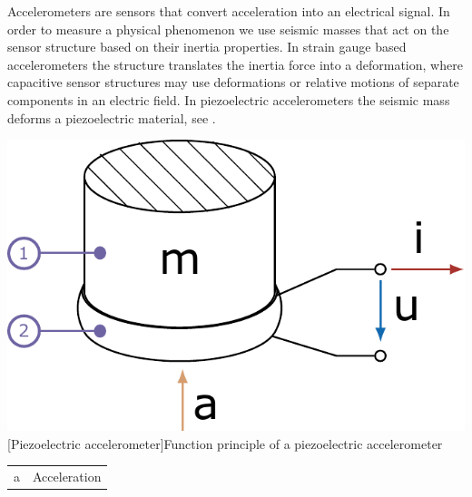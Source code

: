 Accelerometers are sensors that convert acceleration into an electrical signal. In order to measure a physical phenomenon we use seismic masses that act on the sensor structure based on their inertia properties. In strain gauge based accelerometers the structure translates the inertia force into a deformation, where capacitive sensor structures may use deformations or relative motions of separate components in an electric field. In piezoelectric accelerometers the seismic mass deforms a piezoelectric material, see .
\\[4ex]
\begin{minipage}{\linewidth}
\centering
\begin{minipage}[b]{0.35\textwidth}
    \centering
    \includegraphics[scale=0.5]{figures/measurement/sensors/piezo_sensor}
    [Piezoelectric accelerometer]{Function principle of a piezoelectric accelerometer}
    \label{fig:piezo_sensor}
\end{minipage}
\hspace{4em}
\begin{minipage}[b]{0.3\textwidth}
    \centering
    \footnotesize
    \def\circlabel#1#2{%
        \begin{tikzpicture}[%
            x=1em,y=1ex,
            baseline={([yshift=3] N.south)},
            font={\fontsize{6pt}{6.2pt}\selectfont},
            ]%
            \node[%
                circle, fill=white, draw=#1, line width=1pt,
                inner sep=2pt, minimum size=8pt, align=center,
                ] (N) {#2};
        \end{tikzpicture}
    }
    \begin{tabular}{c@{ :\hskip 0.5em}l}
        \toprule
        \large{a} & Acceleration\\

\end{tabular}
\end{minipage}
\end{minipage}

